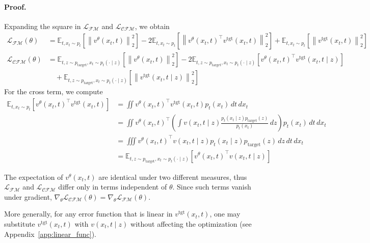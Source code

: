 \paragraph{Proof.}
Expanding the square in $\mathcal{L_\text{FM}}$ and $\mathcal{L_\text{CFM}}$, we obtain
\begin{align*}
   \mathcal{L_{\text{FM}}} (\theta) &=  \mathbb{E}_{t, x_t \sim p_t} \left[ \left\| v^\theta (x_t, t) \right\|_2^2 \right] - 2 \mathbb{E}_{t, x_t \sim p_t} \left[ \left\| {v^\theta (x_t, t)}^\top v^\text{tgt} (x_t, t)\right\|_2^2 \right] + \mathbb{E}_{t, x_t \sim p_t} \left[ \left\| v^\text{tgt} (x_t, t) \right\|_2^2 \right] \\
    \mathcal{L_{\text{CFM}}} (\theta) &= \mathbb{E}_{t, z \sim p_\text{target}, x_t \sim p_t(\cdot \mid z)} \left[ \left\| v^\theta (x_t, t) \right\|_2^2 \right] - 2  \mathbb{E}_{t, z \sim p_\text{target}, x_t \sim p_t(\cdot \mid z)} \left[ {v^\theta (x_t, t)}^\top v^\text{tgt} (x_t, t \mid z) \right] \\
    &\quad + \mathbb{E}_{t, z \sim p_\text{target}, x_t \sim p_t(\cdot \mid z)} \left[ \left\| v^\text{tgt} (x_t, t \mid z) \right\|_2^2 \right]
\end{align*}
%
For the cross term, we compute
%
\begin{align*}
\mathbb{E}_{t, x_t \sim p_t} \left[ {v^\theta(x_t, t)}^\top v^\text{tgt}(x_t, t) \right] &= \iint {v^\theta(x_t, t)}^\top v^\text{tgt}(x_t, t) p_t(x_t) \, dt \, dx_t \\
&= \iint {v^\theta(x_t, t)}^\top \left( \int v(x_t, t \mid z) \frac{p_t(x_t \mid z) p_\text{target}(z)}{p_t(x_t)} \, dz \right) p_t(x_t) \, dt \, dx_t \\
&= \iiint {v^\theta(x_t, t)}^\top v(x_t, t \mid z) p_t(x_t \mid z) p_\text{target}(z) \, dz \, dt \, dx_t \\
&= \mathbb{E}_{t, z \sim p_\text{target}, x_t \sim p_t(\cdot \mid z)} \left[ {v^\theta(x_t, t)}^\top v(x_t, t \mid z) \right]
\end{align*}

The expectation of $v^\theta(x_t, t)$ are identical under two different measures, thus $\mathcal{L_{\text{FM}}}$ and $\mathcal{L_{\text{CFM}}}$ differ only in terms independent of $\theta$. Since such terms vanish under gradient, $\nabla_\theta \mathcal{L_{\text{CFM}}} (\theta) = \nabla_\theta \mathcal{L_{\text{FM}}} (\theta)$.

More generally, for any error function that is linear in $v^\text{tgt}(x_t, t)$, one may substitute $v^\text{tgt}(x_t, t)$ with $v(x_t, t \mid z)$ without affecting the optimization (see Appendix~\ref{app:linear_func}).
